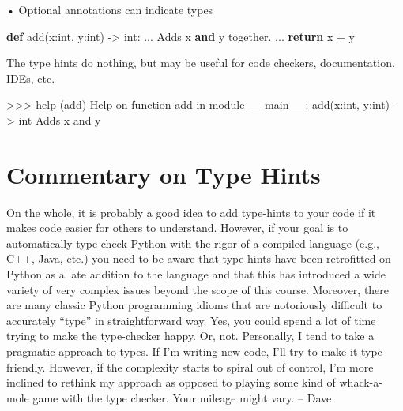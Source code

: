\documentclass[
  letterpaper,
  DIV=11,
  numbers=noendperiod]{scrreprt}
\newenvironment{Shaded}{\begin{snugshade}}{\end{snugshade}}
\newcommand{\BuiltInTok}[1]{\textcolor[rgb]{0.00,0.23,0.31}{#1}}
\newcommand{\ControlFlowTok}[1]{\textcolor[rgb]{0.00,0.23,0.31}{\textbf{#1}}}
\newcommand{\KeywordTok}[1]{\textcolor[rgb]{0.00,0.23,0.31}{\textbf{#1}}}
\newcommand{\NormalTok}[1]{\textcolor[rgb]{0.00,0.23,0.31}{#1}}
\newcommand{\OperatorTok}[1]{\textcolor[rgb]{0.37,0.37,0.37}{#1}}
\begin{document}
• Optional annotations can indicate types

\begin{Shaded}
\begin{Highlighting}[]
\KeywordTok{def}\NormalTok{ add(x:}\BuiltInTok{int}\NormalTok{, y:}\BuiltInTok{int}\NormalTok{) }\OperatorTok{{-}\textgreater{}} \BuiltInTok{int}\NormalTok{:}
\NormalTok{    ...}
\NormalTok{    Adds x }\KeywordTok{and}\NormalTok{ y together.}
\NormalTok{    ...}
    \ControlFlowTok{return}\NormalTok{ x }\OperatorTok{+}\NormalTok{ y }
\end{Highlighting}
\end{Shaded}

The type hints do nothing, but may be useful for code checkers,
documentation, IDEs, etc.

\begin{Shaded}
\begin{Highlighting}[]
\NormalTok{\textgreater{}\textgreater{}\textgreater{} help (add)  }
\NormalTok{Help on function add in module \_\_main\_\_:  }
\NormalTok{add(x:int, y:int) {-}\textgreater{} int  }
\NormalTok{Adds x and y }
\end{Highlighting}
\end{Shaded}


\chapter{Commentary on Type Hints}\label{commentary-on-type-hints}

On the whole, it is probably a good idea to add type-hints to your code
if it makes code easier for others to understand. However, if your goal
is to automatically type-check Python with the rigor of a compiled
language (e.g., C++, Java, etc.) you need to be aware that type hints
have been retrofitted on Python as a late addition to the language and
that this has introduced a wide variety of very complex issues beyond
the scope of this course. Moreover, there are many classic Python
programming idioms that are notoriously difficult to accurately ``type''
in straightforward way. Yes, you could spend a lot of time trying to
make the type-checker happy. Or, not. Personally, I tend to take a
pragmatic approach to types. If I'm writing new code, I'll try to make
it type-friendly. However, if the complexity starts to spiral out of
control, I'm more inclined to rethink my approach as opposed to playing
some kind of whack-a-mole game with the type checker. Your mileage might
vary. -- Dave
\end{document}
